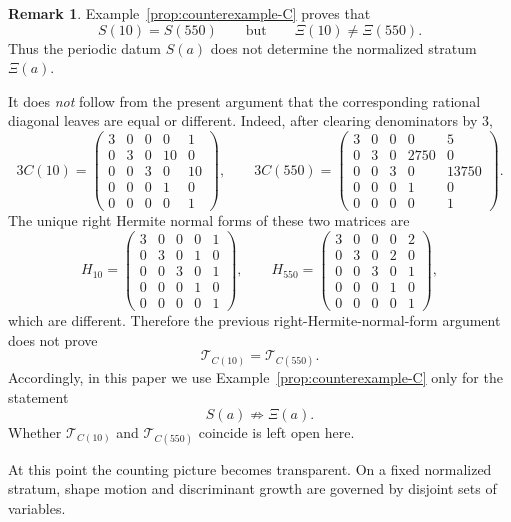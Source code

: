 \documentclass[11pt,letterpaper]{amsart}
\theoremstyle{plain}
\theoremstyle{definition}
\newtheorem{remark}[theorem]{Remark}
\begin{document}
\begin{remark}
\label{rem:sextic-same-leaf}
Example~\ref{prop:counterexample-C} proves that
\[
S(10)=S(550)
\qquad\text{but}\qquad
\Xi(10)\neq \Xi(550).
\]
Thus the periodic datum \(S(a)\) does not determine the normalized
stratum \(\Xi(a)\).

It does \emph{not} follow from the present argument that the corresponding
rational diagonal leaves are equal or different. Indeed, after clearing
denominators by \(3\),
\[
3C(10)=
\begin{pmatrix}
3&0&0&0&1\\
0&3&0&10&0\\
0&0&3&0&10\\
0&0&0&1&0\\
0&0&0&0&1
\end{pmatrix},
\qquad
3C(550)=
\begin{pmatrix}
3&0&0&0&5\\
0&3&0&2750&0\\
0&0&3&0&13750\\
0&0&0&1&0\\
0&0&0&0&1
\end{pmatrix}.
\]
The unique right Hermite normal forms of these two matrices are
\[
H_{10}=
\begin{pmatrix}
3&0&0&0&1\\
0&3&0&1&0\\
0&0&3&0&1\\
0&0&0&1&0\\
0&0&0&0&1
\end{pmatrix},
\qquad
H_{550}=
\begin{pmatrix}
3&0&0&0&2\\
0&3&0&2&0\\
0&0&3&0&1\\
0&0&0&1&0\\
0&0&0&0&1
\end{pmatrix},
\]
which are different. Therefore the previous right-Hermite-normal-form argument
does not prove
\[
\mathcal T_{C(10)}=\mathcal T_{C(550)}.
\]
Accordingly, in this paper we use Example~\ref{prop:counterexample-C} only for
the statement
\[
S(a)\not\Rightarrow \Xi(a).
\]
Whether \(\mathcal T_{C(10)}\) and \(\mathcal T_{C(550)}\) coincide is left
open here.
\end{remark}

At this point the counting picture becomes transparent. On a fixed normalized stratum, shape motion and discriminant growth are governed by disjoint sets of variables.
\end{document}
